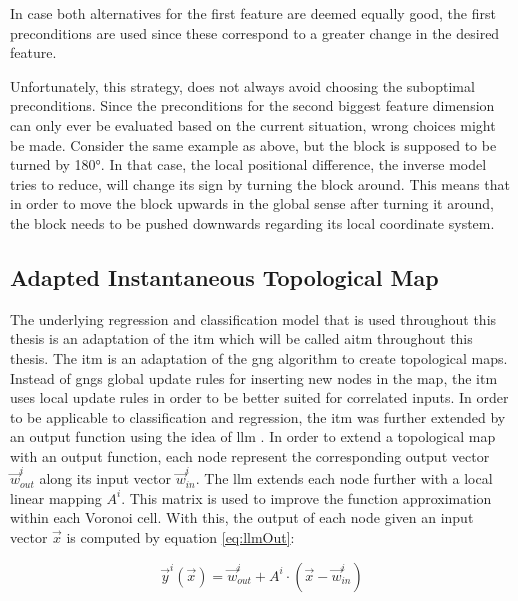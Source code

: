 In case both alternatives for the first feature are deemed equally good, the first preconditions are used since these correspond to a greater change in the desired feature.

Unfortunately, this strategy, does not always avoid choosing the suboptimal preconditions. Since the preconditions for the second biggest feature dimension can only ever be evaluated based on the current situation, wrong choices might be made. Consider the same example as above, but the block is supposed to be turned by 180°. In that case, the local positional difference, the inverse model tries to reduce, will change its sign by turning the block around. This means that in order to move the block upwards in the global sense after turning it around, the block needs to be pushed downwards regarding its local coordinate system. %


\subsection{Adapted Instantaneous Topological Map \label{sec:ITM}}
The underlying regression and classification model that is used throughout this thesis is an adaptation of the \acrfull{itm} which will be called \acrfull{aitm} throughout this thesis.
The \gls{itm} \cite{itm} is an adaptation of the \gls{gng} \cite{gng} algorithm to create topological maps. Instead of \glspl{gng} global update rules for inserting new nodes in the map, the \gls{itm} uses local update rules in order to be better suited for correlated inputs. 
In order to be applicable to classification and regression, the \gls{itm} was further extended by an output function using the idea of \gls{llm} \cite{LLM}. In order to extend a topological map with an output function, each node represent the corresponding output vector $\vec{w}^i_{out}$ along its input vector $\vec{w}^i_{in}$. The \gls{llm} extends each node further with a local linear mapping $A^i$. This matrix is used to improve the function approximation within each Voronoi cell. With this, the output of each node given an input vector $\vec{x}$ is computed by equation \ref{eq:llmOut}:

\begin{equation}
\vec{y}^i(\vec{x}) = \vec{w}^i_{out} + A^i \cdot (\vec{x}-\vec{w}^i_{in})
\label{eq:llmOut}
\end{equation}


